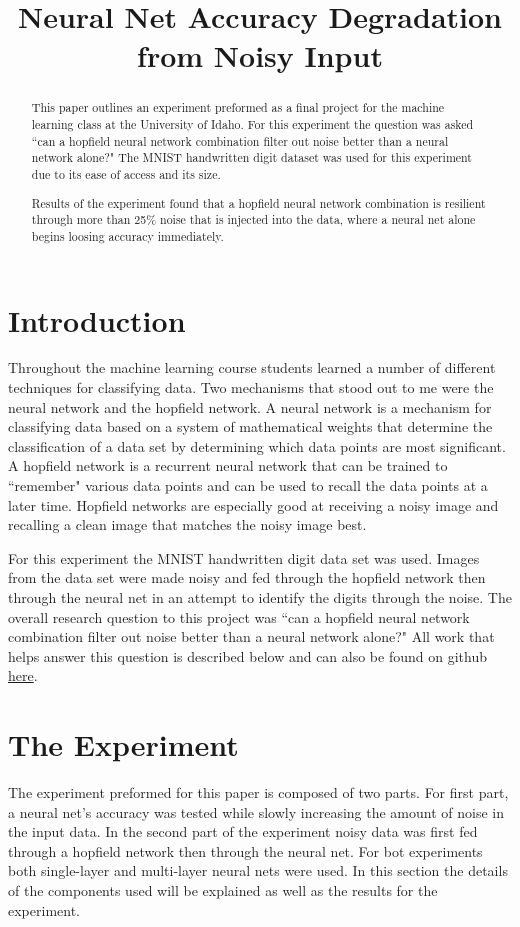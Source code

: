 \documentclass{IEEEtran}
\author{
	\IEEEauthorblockN{MatthewBrown\\}
	\IEEEauthorblockA{Machine Learning Final Project\\University of Idaho}	
}
\title{Neural Net Accuracy Degradation from Noisy Input}
\begin{document}
	\maketitle
	\begin{abstract}
		This paper outlines an experiment preformed as a final project for the machine learning class at the University of Idaho. For this experiment the question was asked ``can a hopfield neural network combination filter out noise better than a neural network alone?" The MNIST handwritten digit dataset was used for this experiment due to its ease of access and its size.
		
		Results of the experiment found that a hopfield neural network combination is resilient through more than 25\% noise that is injected into the data, where a neural net alone begins loosing accuracy immediately.
	\end{abstract}
	
	\section{Introduction}
		Throughout the machine learning course students learned a number of different techniques for classifying data. Two mechanisms that stood out to me were the neural network and the hopfield network. A neural network is a mechanism for classifying data based on a system of mathematical weights that determine the classification of a data set by determining which data points are most significant. A hopfield network is a recurrent neural network that can be trained to ``remember" various data points and can be used to recall the data points at a later time. Hopfield networks are especially good at receiving a noisy image and recalling a clean image that matches the noisy image best.
		
		For this experiment the MNIST handwritten digit data set was used. Images from the data set were made noisy and fed through the hopfield network then through the neural net in an attempt to identify the digits through the noise. The overall research question to this project was ``can a hopfield neural network combination filter out noise better than a neural network alone?" All work that helps answer this question is described below and can also be found on github \href{https://github.com/1BADragon/MachineLearning}{here}.
		
	\section{The Experiment}
		The experiment preformed for this paper is composed of two parts. For first part, a neural net's accuracy was tested while slowly increasing the amount of noise in the input data. In the second part of the experiment noisy data was first fed through a hopfield network then through the neural net. For bot experiments both single-layer and multi-layer neural nets were used. In this section the details of the components used will be explained as well as the results for the experiment.
\end{document}

